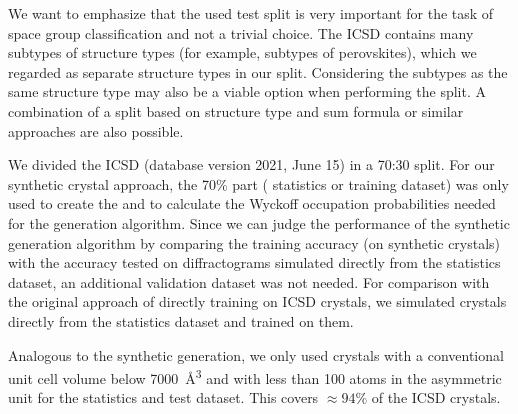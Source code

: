     We want to emphasize that the used test split is very important for the task of
    space group classification and not a trivial choice. The ICSD contains many
    subtypes of structure types (for example, subtypes of perovskites), which we
    regarded as separate structure types in our split. Considering the subtypes
    as the same structure type may also be a viable option when performing the
    split. A combination of a split based on structure type and sum formula or
    similar approaches are also possible. 


    We divided the ICSD (database version 2021, June 15) in a 70:30 split. For
    our synthetic crystal approach, the 70\% part ( statistics or training dataset) was only used to create the
     and to calculate the Wyckoff
    occupation probabilities needed for the generation algorithm. Since we can
    judge the performance of the synthetic generation algorithm by comparing the
    training accuracy (on synthetic crystals) with the accuracy tested on
    diffractograms simulated directly from the statistics dataset, an additional
    validation dataset was not needed. For comparison with the original approach
    of directly training on ICSD
    crystals\supercite{parkClassificationCrystalStructure2017}, we simulated
    crystals directly from the statistics dataset and trained on them.

    Analogous to the synthetic generation, we only used crystals with a
    conventional unit cell volume below \SI{7000}{\angstrom\cubed} and with less
    than 100 atoms in the asymmetric unit for the statistics and test dataset.
    This covers $ \approx 94\% $ of the ICSD crystals.

